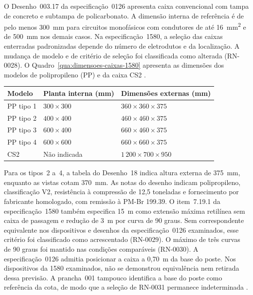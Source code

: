 O Desenho~003.17 da especificação~0126 apresenta caixa convencional com tampa de concreto e subtampa de policarbonato. A dimensão interna de referência é de pelo menos 300~mm para circuitos monofásicos com condutores de até 16~mm\textsuperscript{2} e de 500~mm nos demais casos. Na especificação~1580, a seleção das caixas enterradas padronizadas depende do número de eletrodutos e da localização. A mudança de modelo e de critério de seleção foi classificada como alterada (RN-0028). O Quadro~\ref{qua:dimensoes-caixas-1580} apresenta as dimensões dos modelos de polipropileno (PP) e da caixa CS2 \cite[item~7.6.1.4, alínea~e e Desenho~003.17]{enel0126}\cite[item~7.19.1 e Desenho~18]{enel1580}.

\par\noindent
\begin{minipage}{\linewidth}
  \label{qua:dimensoes-caixas-1580}
  \vspace{0.7\baselineskip}
  \centering
  {\small
  \renewcommand{\arraystretch}{1.17}
  \begin{tabular}{|l|l|l|}
    \hline
    \textbf{Modelo} & \textbf{Planta interna (mm)} & \textbf{Dimensões externas (mm)} \\\hline
    PP tipo 1 & \(300\times300\) & \(360\times360\times375\) \\\hline
    PP tipo 2 & \(400\times400\) & \(460\times460\times375\) \\\hline
    PP tipo 3 & \(600\times400\) & \(660\times460\times375\) \\\hline
    PP tipo 4 & \(600\times600\) & \(660\times660\times375\) \\\hline
    CS2 & Não indicada & \(1\,200\times700\times950\) \\\hline
  \end{tabular}
  }
\end{minipage}
\par

Para os tipos~2 a~4, a tabela do Desenho~18 indica altura externa de 375~mm, enquanto as vistas cotam 370~mm. As notas do desenho indicam polipropileno, classificação V2, resistência à compressão de 12,5 toneladas e fornecimento por fabricante homologado, com remissão à PM-Br 199.39. O item~7.19.1 da especificação~1580 também especifica 15~m como extensão máxima retilínea sem caixa de passagem e redução de 3~m por curva de 90 graus. Sem correspondente equivalente nos dispositivos e desenhos da especificação~0126 examinados, esse critério foi classificado como acrescentado (RN-0029). O máximo de três curvas de 90 graus foi mantido nas condições comparáveis (RN-0030). A especificação~0126 admitia posicionar a caixa a 0,70~m da base do poste. Nos dispositivos da 1580 examinados, não se demonstrou equivalência nem retirada dessa previsão. A prancha~001 tampouco identifica a base do poste como referência da cota, de modo que a seleção de RN-0031 permanece indeterminada \cite[item~7.6.1.4, alíneas~e--g e Desenho~003.17]{enel0126}\cite[item~7.19.1 e Desenho~18]{enel1580}.


